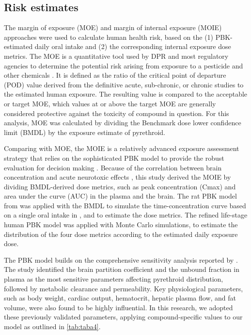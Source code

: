 \documentclass[toxics,article,submit,pdftex,moreauthors]{Definitions/mdpi}
\begin{document}
\subsection{Risk estimates}\label{risk-estimates}

The margin of exposure (MOE) and margin of internal exposure (MOIE)
approaches were used to calculate human health risk, based on the (1)
PBK-estimated daily oral intake and (2) the corresponding internal
exposure dose metrics. The MOE is a quantitative tool used by DPR and
most regulatory agencies to determine the potential risk arising from
exposure to a pesticide and other chemicals
\citep{beaudouin2010stochastic, beauvais_human_2010}. It is defined as
the ratio of the critical point of departure (POD) value derived from
the definitive acute, sub-chronic, or chronic studies to the estimated
human exposure. The resulting value is compared to the acceptable or
target MOE, which values at or above the target MOE are generally
considered protective against the toxicity of compound in question. For
this analysis, MOE was calculated by dividing the Benchmark dose lower confidence limit (BMDL) by the exposure
estimate of pyrethroid.

Comparing with MOE, the MOIE is a relatively advanced exposure
assessment strategy that relies on the sophisticated PBK model to
provide the robust evaluation for decision making
\citep{bessems_margin_2017}. Because of the correlation between brain
concentration and acute neurotoxic effects
\citep{scollon_correlation_2011}, this study derived the MOIE by
dividing BMDL-derived dose metrics, such as peak concentration (Cmax)
and area under the curve (AUC) in the plasma and the brain. The rat PBK
model from \citet{song2019evaluation} was applied with the BMDL to
simulate the time-concentration curve based on a single oral intake in
\citet{wolansky_relative_2006}, and to estimate the dose metrics. The
refined life-stage human PBK model was applied with Monte Carlo
simulations, to estimate the distribution of the four dose metrics
according to the estimated daily exposure dose. 

The PBK model builds on the comprehensive sensitivity analysis reported by
\citet{mallick2020development}. The study identified the brain partition coefficient and
the unbound fraction in plasma as the most sensitive parameters affecting
pyrethroid distribution, followed by metabolic clearance and permeability. Key
physiological parameters, such as body weight, cardiac output, hematocrit,
hepatic plasma flow, and fat volume, were also found to be highly influential.
In this research, we adopted these previously validated parameters,
applying compound-specific values to our model as outlined in \ref{tab:taba4}.
\end{document}
